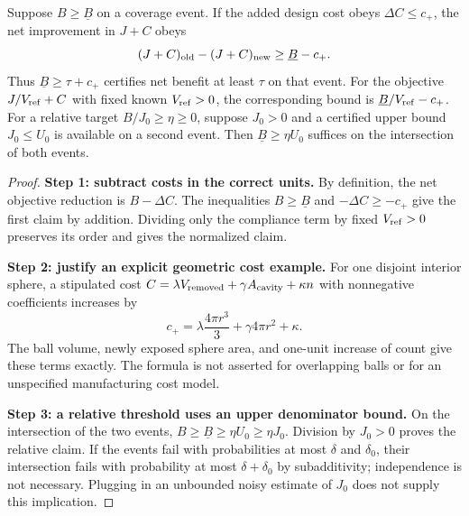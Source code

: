 \begin{proposition}
\label{prop:benefitcost}
Suppose $B\ge\underline B$ on a coverage event. If the added design cost
obeys $\Delta C\le c_+$, the net improvement in $J+C$ obeys
\[
 (J+C)_{\rm old}-(J+C)_{\rm new}\ge\underline B-c_+.
\]
Thus $\underline B\ge\tau+c_+$ certifies net benefit at least $\tau$ on
that event. For the objective $J/V_{\rm ref}+C$ with fixed known
$V_{\rm ref}>0$, the corresponding bound is $\underline B/V_{\rm ref}-c_+$.
For a relative target $B/J_0\ge\eta\ge0$, suppose $J_0>0$ and a certified
upper bound $J_0\le U_0$ is available on a second event. Then
$\underline B\ge\eta U_0$ suffices on the intersection of both events.
\end{proposition}
\begin{proof}
\textbf{Step 1: subtract costs in the correct units.}
By definition, the net objective reduction is $B-\Delta C$.
The inequalities $B\ge\underline B$ and $-\Delta C\ge-c_+$ give the first
claim by addition. Dividing only the compliance term by fixed
$V_{\rm ref}>0$ preserves its order and gives the normalized claim.

\textbf{Step 2: justify an explicit geometric cost example.}
For one disjoint interior sphere, a stipulated cost
$C=\lambda V_{\rm removed}+\gamma A_{\rm cavity}+\kappa n$ with nonnegative
coefficients increases by
\[
 c_+=\lambda\frac{4\pi r^3}{3}+\gamma4\pi r^2+\kappa.
\]
The ball volume, newly exposed sphere area, and one-unit increase of count
give these terms exactly. The formula is not asserted for overlapping
balls or for an unspecified manufacturing cost model.

\textbf{Step 3: a relative threshold uses an upper denominator bound.}
On the intersection of the two events,
$B\ge\underline B\ge\eta U_0\ge\eta J_0$.
Division by $J_0>0$ proves the relative claim. If the events fail with
probabilities at most $\delta$ and $\delta_0$, their intersection fails
with probability at most $\delta+\delta_0$ by subadditivity; independence
is not necessary. Plugging in an unbounded noisy estimate of $J_0$ does not
supply this implication.
\end{proof}

